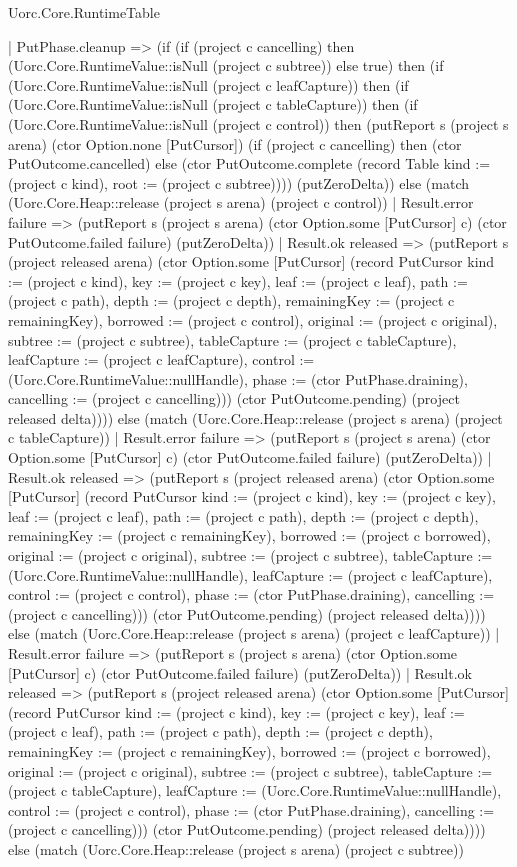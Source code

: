 \begin{lexlean}{Uorc.Core.RuntimeTable}
\begin{semanticmodule}
{      | PutPhase.cleanup => (if (if (project c cancelling) then (Uorc.Core.RuntimeValue::isNull (project c subtree)) else true) then (if (Uorc.Core.RuntimeValue::isNull (project c leafCapture)) then (if (Uorc.Core.RuntimeValue::isNull (project c tableCapture)) then (if (Uorc.Core.RuntimeValue::isNull (project c control)) then (putReport s (project s arena) (ctor Option.none [PutCursor]) (if (project c cancelling) then (ctor PutOutcome.cancelled) else (ctor PutOutcome.complete (record Table {kind := (project c kind), root := (project c subtree)}))) (putZeroDelta)) else (match (Uorc.Core.Heap::release (project s arena) (project c control))
        | Result.error failure => (putReport s (project s arena) (ctor Option.some [PutCursor] c) (ctor PutOutcome.failed failure) (putZeroDelta))
        | Result.ok released => (putReport s (project released arena) (ctor Option.some [PutCursor] (record PutCursor {kind := (project c kind), key := (project c key), leaf := (project c leaf), path := (project c path), depth := (project c depth), remainingKey := (project c remainingKey), borrowed := (project c control), original := (project c original), subtree := (project c subtree), tableCapture := (project c tableCapture), leafCapture := (project c leafCapture), control := (Uorc.Core.RuntimeValue::nullHandle), phase := (ctor PutPhase.draining), cancelling := (project c cancelling)})) (ctor PutOutcome.pending) (project released delta)))) else (match (Uorc.Core.Heap::release (project s arena) (project c tableCapture))
        | Result.error failure => (putReport s (project s arena) (ctor Option.some [PutCursor] c) (ctor PutOutcome.failed failure) (putZeroDelta))
        | Result.ok released => (putReport s (project released arena) (ctor Option.some [PutCursor] (record PutCursor {kind := (project c kind), key := (project c key), leaf := (project c leaf), path := (project c path), depth := (project c depth), remainingKey := (project c remainingKey), borrowed := (project c borrowed), original := (project c original), subtree := (project c subtree), tableCapture := (Uorc.Core.RuntimeValue::nullHandle), leafCapture := (project c leafCapture), control := (project c control), phase := (ctor PutPhase.draining), cancelling := (project c cancelling)})) (ctor PutOutcome.pending) (project released delta)))) else (match (Uorc.Core.Heap::release (project s arena) (project c leafCapture))
        | Result.error failure => (putReport s (project s arena) (ctor Option.some [PutCursor] c) (ctor PutOutcome.failed failure) (putZeroDelta))
        | Result.ok released => (putReport s (project released arena) (ctor Option.some [PutCursor] (record PutCursor {kind := (project c kind), key := (project c key), leaf := (project c leaf), path := (project c path), depth := (project c depth), remainingKey := (project c remainingKey), borrowed := (project c borrowed), original := (project c original), subtree := (project c subtree), tableCapture := (project c tableCapture), leafCapture := (Uorc.Core.RuntimeValue::nullHandle), control := (project c control), phase := (ctor PutPhase.draining), cancelling := (project c cancelling)})) (ctor PutOutcome.pending) (project released delta)))) else (match (Uorc.Core.Heap::release (project s arena) (project c subtree))
}
\end{semanticmodule}
\end{lexlean}
